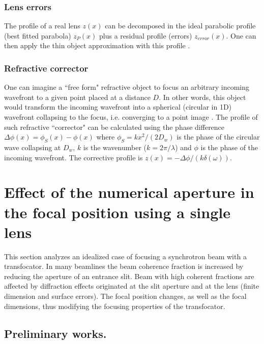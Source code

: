 \documentclass{iucr}              %
\begin{document}
\subsubsection{Lens errors}
The profile of a real lens $z(x)$ can be decomposed in the ideal parabolic profile (best fitted parabola) $z_P(x)$ plus a residual profile (errors) $z_{error}(x)$. One can then apply the thin object approximation with this profile \cite{Celestre:mo5214}. 

\subsubsection{Refractive corrector}
\label{sec:refractorCorrector}
One can imagine a ``free form" refractive object to focus an arbitrary incoming wavefront to a given point placed at a distance $D$. In other words, this object would transform the incoming wavefront into a spherical (circular in 1D) wavefront collapsing to the focus, i.e. converging to a point image \cite{ChubarElleaumeSnigirev2001}. The profile of such refractive ``corrector"  can be calculated using the phase difference $\Delta\phi(x)=\phi_S(x)-\phi(x)$ where $\phi_S=k x^2 / (2 D_w)$ is the phase of the circular wave collapsing at $D_w$, $k$ is the wavenumber ($k=2\pi/\lambda$) and $\phi$ is the phase of the incoming wavefront. The corrective profile is $z(x)=-\Delta\phi/(k \delta(\omega))$.



\section{Effect of the numerical aperture in the focal position using a single lens}\label{sec:onelens}

This section analyzes an idealized case of focusing a synchrotron beam with a transfocator. In many beamlines the beam coherence fraction is increased by reducing the aperture of an entrance slit. Beam with high coherent fractions are affected by diffraction effects originated at the slit aperture and at the lens (finite dimension and surface errors). The focal position changes, as well as the focal dimensions, thus modifying the focusing properties of the transfocator. 

\subsection{Preliminary works.}
\end{document}
